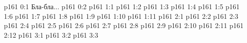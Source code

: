 \author{Промежуточные создания}
\vs p161 0:1  Бла-бла...
\vs p161 0:2 
\vs p161 1:1 
\vs p161 1:2 
\vs p161 1:3 
\vs p161 1:4 
\vs p161 1:5 
\vs p161 1:6 
\vs p161 1:7 
\vs p161 1:8 
\vs p161 1:9 
\vs p161 1:10 
\vs p161 1:11 \pc 
{}
\vs p161 2:1 
\vs p161 2:2 
\vs p161 2:3 
\vs p161 2:4 
\vs p161 2:5 
\vs p161 2:6 
\vs p161 2:7 
\vs p161 2:8 
\vs p161 2:9 
\vs p161 2:10 
\vs p161 2:11 \pc 
\vs p161 2:12 
\vs p161 3:1 
\vs p161 3:2 
\vs p161 3:3 
\quizlink
